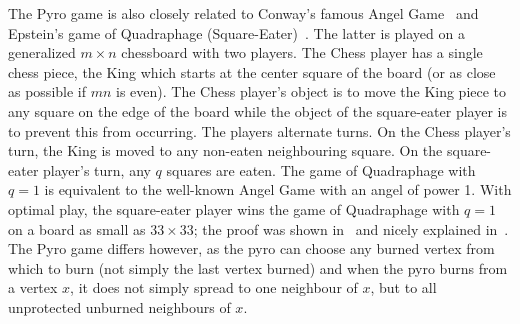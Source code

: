\documentclass[12pt]{article}
\begin{document}
The Pyro game is also closely related to Conway's famous Angel Game~\cite{Conway} and Epstein's game of Quadraphage (Square-Eater)~\cite{Gardner}.  The latter is played on a generalized $m \times n$ chessboard with two players.  The Chess player has a single chess piece, the King which starts at the center square of the board (or as close as possible if $mn$ is even).  The Chess player's object is to move the King piece to any square on the edge of the board while the object of the square-eater player is to prevent this from occurring.  The players alternate turns.  On the Chess player's turn, the King is moved to any non-eaten neighbouring square.  On the square-eater player's turn, any $q$ squares are eaten.  The game of Quadraphage with $q=1$ is equivalent to the well-known Angel Game with an angel of power 1.  With optimal play, the square-eater player wins the game of Quadraphage with $q=1$ on a board as small as $33 \times 33$; the proof was shown in~\cite{BCG} and nicely explained in~\cite{kutz}.  The Pyro game differs however, as the pyro can choose any burned vertex from which to burn (not simply the last vertex burned) and when the pyro burns from a vertex $x$, it does not simply spread to one neighbour of $x$, but to all unprotected unburned neighbours of $x$.  

\end{document}

